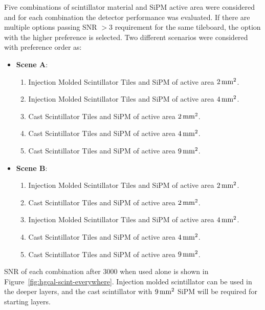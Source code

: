 Five combinations of scintillator material and \gls{SiPM} active area
were considered and for each combination the detector
performance was evaluated. If there are
multiple options passing \gls{SNR} \(> 3\) requirement for the same tileboard,
the option with the higher preference is selected. Two different scenarios were
considered with preference order as:

\begin{itemize}
  \item \textbf{Scene A}:
        \begin{enumerate}
          \item Injection Molded Scintillator Tiles and SiPM of active area \( 2\,\text{mm}{}^2 \).
          \item Injection Molded Scintillator Tiles and SiPM of active area \( 4\,\text{mm}{}^2 \).
          \item Cast Scintillator Tiles and SiPM of active area \( 2\,\text{mm}{}^2 \).
          \item Cast Scintillator Tiles and SiPM of active area \( 4\,\text{mm}{}^2 \).
          \item Cast Scintillator Tiles and SiPM of active area \( 9\,\text{mm}{}^2 \).
        \end{enumerate}
  \item \textbf{Scene B}:
        \begin{enumerate}
          \item Injection Molded Scintillator Tiles and SiPM of active area \( 2\,\text{mm}{}^2 \).
          \item Cast Scintillator Tiles and SiPM of active area \( 2\,\text{mm}{}^2 \).
          \item Injection Molded Scintillator Tiles and SiPM of active area \( 4\,\text{mm}{}^2 \).
          \item Cast Scintillator Tiles and SiPM of active area \( 4\,\text{mm}{}^2 \).
          \item Cast Scintillator Tiles and SiPM of active area \( 9\,\text{mm}{}^2 \).
        \end{enumerate}
\end{itemize}

\gls{SNR} of each combination after 3000 \fbinv{} when used alone is shown in
Figure~\ref{fig:hgcal-scint-everywhere}.
Injection molded scintillator can be used in the deeper layers,
and the cast scintillator with \(9 \,\text{mm}{}^{2}\) \gls{SiPM} will be required
for starting layers.

